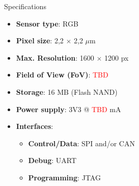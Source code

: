 %
%
%
%
%

%
%
%
%
%


\begin{frame}{Specifications}

    \begin{itemize}
        \item \textbf{Sensor type}: RGB
        \item \textbf{Pixel size}: 2,2 $\times$ 2,2 $\mu$m
        \item \textbf{Max. Resolution}: 1600 $\times$ 1200 px
        \item \textbf{Field of View (FoV)}: \textcolor{red}{TBD}
        \item \textbf{Storage}: 16 MB (Flash NAND)
        \item \textbf{Power supply}: 3V3 @ \textcolor{red}{TBD} mA
        \item \textbf{Interfaces}:
            \begin{itemize}
                \item \textbf{Control/Data}: SPI and/or CAN
                \item \textbf{Debug}: UART
                \item \textbf{Programming}: JTAG
            \end{itemize}
    \end{itemize}

\end{frame}


